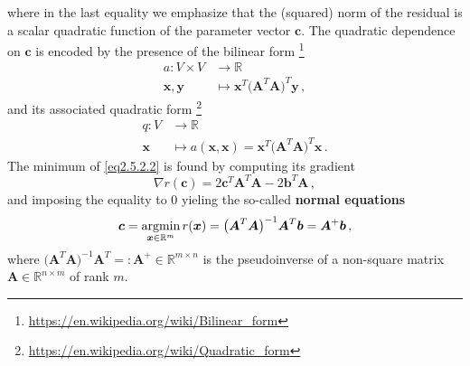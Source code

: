 \documentclass[../main.tex]{subfiles}
\begin{document}
where in the last equality we emphasize that the (squared) norm of the residual is a scalar quadratic function of the parameter vector $\boldsymbol{c}$.
The quadratic dependence on $\boldsymbol{c}$ is encoded by the presence of the bilinear form \footnote{\url{https://en.wikipedia.org/wiki/Bilinear_form}}
\begin{align*}
        a : V\times V &\to \mathbb{R} \nonumber \\
            \boldsymbol{x},\boldsymbol{y} &\mapsto \boldsymbol{x}^{T}\big(\boldsymbol{A}^{T}\boldsymbol{A}\big)^{T}\boldsymbol{y} \,,
\end{align*}
and its associated quadratic form \footnote{\url{https://en.wikipedia.org/wiki/Quadratic_form}}
\begin{align*}
        q : V &\to \mathbb{R} \nonumber \\
        \boldsymbol{x} &\mapsto a(\boldsymbol{x},\boldsymbol{x}) = \boldsymbol{x}^{T}\big(\boldsymbol{A}^{T}\boldsymbol{A}\big)^{T}\boldsymbol{x}\,.
\end{align*}
The minimum of \eqref{eq2.5.2.2} is found by computing its gradient
\begin{equation*}
     \nabla r(\boldsymbol{c}) = 2 \boldsymbol{c}^{T}\boldsymbol{A}^{T}\boldsymbol{A} - 2 \boldsymbol{b}^{T}\boldsymbol{A}\,,
\end{equation*}
and imposing the equality to $0$ yieling the so-called \textbf{normal equations}
\begin{equation}\label{eq2.5.2.3}
        \boldsymbol{c} = \operatorname*{argmin}_{\boldsymbol{x}\in \mathbb{R}^{m}}r(\boldsymbol{x}) = \big(\boldsymbol{A}^{T}\boldsymbol{A}\big)^{-1}\boldsymbol{A}^{T}\boldsymbol{b} = \boldsymbol{A}^{+}\boldsymbol{b} \,,
\end{equation}
where $\big(\boldsymbol{A}^{T}\boldsymbol{A}\big)^{-1}\boldsymbol{A}^{T} =: \boldsymbol{A}^{+}\in \mathbb{R}^{m\times n}$ is the pseudoinverse of a non-square matrix $\boldsymbol{A}\in \mathbb{R}^{n\times m}$ of rank $m$.

\end{document}
